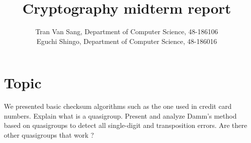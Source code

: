 \documentclass[10pt]{report}
\begin{document}
\title{Cryptography midterm report}
\author{Tran Van Sang, Department of Computer Science, 48-186106\\
Eguchi Shingo, Department of Computer Science, 48-186016}
\maketitle
\tableofcontents

\chapter{Topic}
We presented basic checksum algorithms such as the one used in credit card numbers. Explain what is a quasigroup. Present and analyze Damm’s method based on quasigroups to detect all single-digit and transposition errors. Are there other quasigroups that work ?




% 
% 


\end{document}
